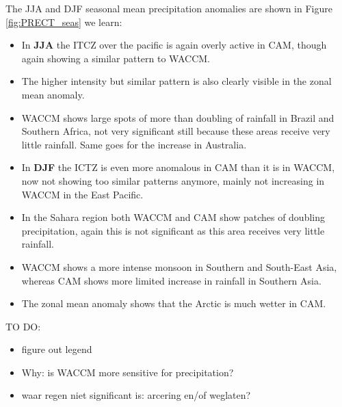 The JJA and DJF seasonal mean precipitation anomalies are shown in Figure \ref{fig:PRECT_seas} we learn:

\begin{itemize}
	\item In \textbf{JJA} the ITCZ over the pacific is again overly active in CAM, though again showing a similar pattern to WACCM. \item The higher intensity but similar pattern is also clearly visible in the zonal mean anomaly. 
	\item WACCM shows large spots of more than doubling of rainfall in Brazil and Southern Africa, not very significant still because these areas receive very little rainfall. Same goes for the increase in Australia.
	\item In \textbf{DJF} the ICTZ is even more anomalous in CAM than it is in WACCM, now not showing too similar patterns anymore, mainly not increasing in WACCM in the East Pacific. 
	\item In the Sahara region both WACCM and CAM show patches of doubling precipitation, again this is not significant as this area receives very little rainfall. 
	\item WACCM shows a more intense monsoon in Southern and South-East Asia, whereas CAM shows more limited increase in rainfall in Southern Asia. 
	\item The zonal mean anomaly shows that the Arctic is much wetter in CAM. 
\end{itemize}

TO DO:
\begin{itemize}
	\item figure out legend
	\item Why: is WACCM more sensitive for precipitation?
	\item waar regen niet significant is: arcering en/of weglaten?
\end{itemize}